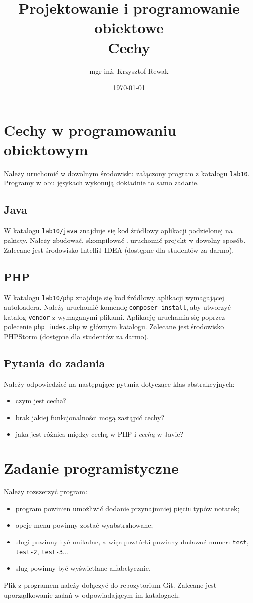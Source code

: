 \documentclass{article}
\title{
	Projektowanie i programowanie obiektowe \\
	\Huge{Cechy}
}
\author{mgr inż. Krzysztof Rewak}
\date{\today}
\begin{document}
	\maketitle
	
	\section{Cechy w programowaniu obiektowym}
	Należy uruchomić w dowolnym środowisku załączony program z katalogu \texttt{lab10}. Programy w obu językach wykonują dokładnie to samo zadanie.
	
	\subsection{Java}
	W katalogu \texttt{lab10/java} znajduje się kod źródłowy aplikacji podzielonej na pakiety. Należy zbudować, skompilować i uruchomić projekt w dowolny sposób. Zalecane jest środowisko IntelliJ IDEA (dostępne dla studentów za darmo).
	
	\subsection{PHP}
	W katalogu \texttt{lab10/php} znajduje się kod źródłowy aplikacji wymagającej autoloadera. Należy uruchomić komendę \texttt{composer install}, aby utworzyć katalog \texttt{vendor} z wymaganymi plikami. Aplikację uruchamia się poprzez polecenie \texttt{php index.php} w głównym katalogu. Zalecane jest środowisko PHPStorm (dostępne dla studentów za darmo).
	
	\subsection{Pytania do zadania}
	Należy odpowiedzieć na następujące pytania dotyczące klas abstrakcyjnych:
	\begin{itemize}
		\item czym jest cecha?
		\item brak jakiej funkcjonalności mogą zastąpić cechy?
		\item jaka jest różnica między cechą w PHP i \emph{cechą} w Javie?
	\end{itemize}

	\section{Zadanie programistyczne}
	Należy rozszerzyć program:
	
	\begin{itemize}
		\item program powinien umożliwić dodanie przynajmniej pięciu typów notatek;
		\item opcje menu powinny zostać wyabstrahowane;
		\item slugi powinny być unikalne, a więc powtórki powinny dodawać numer: \texttt{test}, \texttt{test-2}, \texttt{test-3}...
		\item slug powinny być wyświetlane alfabetycznie.
	\end{itemize}
	
	Plik z programem należy dołączyć do repozytorium Git. Zalecane jest uporządkowanie zadań w odpowiadającym im katalogach.
\end{document}
